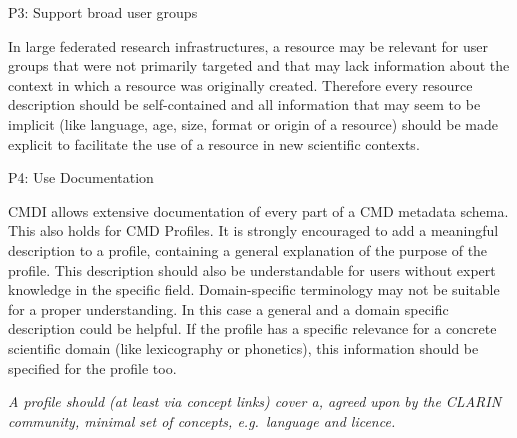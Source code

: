 P3: Support broad user groups


In large federated research infrastructures, a resource may be relevant for user groups that were not primarily targeted and that may lack information about the context in which a resource was originally created. Therefore every resource description should be self-contained and all information that may seem to be implicit (like language, age, size, format or origin of a resource) should be made explicit to facilitate the use of a resource in new scientific contexts.

P4: Use Documentation

 

CMDI allows extensive documentation of every part of a CMD metadata schema. This also holds for CMD Profiles. It is strongly encouraged to add a meaningful description to a profile, containing a general explanation of the purpose of the profile. This description should also be understandable for users without expert knowledge in the specific field. Domain-specific terminology may not be suitable for a proper
understanding. In this case a general and a domain specific description could be helpful. If the profile has a specific relevance for a concrete scientific domain (like lexicography or phonetics), this information should be specified for the profile too.

\begin{workinprogress}

 

\emph{A profile should (at least via concept links) cover a, agreed upon by the CLARIN community, minimal set of concepts, e.g.~language and licence.}

\end{workinprogress}